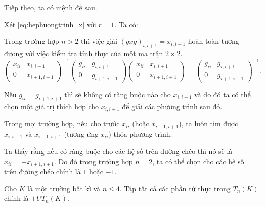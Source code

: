 Tiếp theo, ta có mệnh đề sau.

\begin{rem} \label{rem:truonghop_n=2}
    Xét 
    \cref{eq:hephuongtrinh_x} với $r = 1$. Ta có:
    \begin{thmenum}
        \item Trong trường hợp $n > 2$ thì việc giải $(g x g)_{i,i+1} = x_{i,i+1}$ hoàn toàn tương đương với việc kiểm tra tính thực của một ma trận $2 \times 2$.
        \[
        \begin{pmatrix}
            x_{ii}  &x_{i,i+1}\\
            0       &x_{i+1,i+1}
        \end{pmatrix}^{-1}
        \begin{pmatrix}
            g_{ii}  &g_{i,i+1}\\
            0       &g_{i+1,i+1}
        \end{pmatrix}
        \begin{pmatrix}
            x_{ii}  &x_{i,i+1}\\
            0       &x_{i+1,i+1}
        \end{pmatrix}
        =
        \begin{pmatrix}
            g_{ii}  &g_{i,i+1}\\
            0       &g_{i+1,i+1}
        \end{pmatrix}^{-1}.
        \]
        \item Nếu $g_{ii} = g_{i+1,i+1}$ thì sẽ không có ràng buộc nào cho $x_{i,i+1}$ và do đó ta có thể chọn một giá trị thích hợp cho $x_{i,i+1}$ để giải các phương trình sau đó.
        \item Trong mọi trường hợp, nếu cho trước $x_{ii}$ (hoặc $x_{i+1,i+1}$), ta luôn tìm được $x_{i,i+1}$ và $x_{i+1,i+1}$ (tương ứng $x_{ii}$) thỏa phương trình.
        \item Ta thấy rằng nếu có ràng buộc cho các hệ số trên đường chéo thì nó sẽ là $x_{ii} = -x_{i+1,i+1}$. Do đó trong trường hợp $n = 2$, ta có thể chọn cho các hệ số trên đường chéo chính là $1$ hoặc $-1$. 
    \end{thmenum}
\end{rem}

\begin{prop}\label{prop:menhde2.3}
Cho $K$ là một trường bất kì và $n\leq4$. Tập tất cả các phần tử thực trong $T_n(K)$ chính là $\pm UT_n(K)$.
\end{prop}

